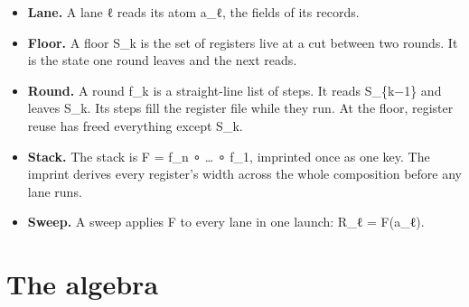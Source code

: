 \begin{itemize}
\item \textbf{Lane.} A lane ℓ reads its atom a\_\allowbreak{}ℓ, the fields of its records.
\item \textbf{Floor.} A floor S\_\allowbreak{}k is the set of registers live at a cut between two rounds. It is the state one round leaves and the next reads.
\item \textbf{Round.} A round f\_\allowbreak{}k is a straight-line list of steps. It reads S\_\allowbreak{}\{k−1\} and leaves S\_\allowbreak{}k. Its steps fill the register file while they run. At the floor, register reuse has freed everything except S\_\allowbreak{}k.
\item \textbf{Stack.} The stack is F = f\_\allowbreak{}n ∘ … ∘ f\_\allowbreak{}1, imprinted once as one key. The imprint derives every register's width across the whole composition before any lane runs.
\item \textbf{Sweep.} A sweep applies F to every lane in one launch: R\_\allowbreak{}ℓ = F(a\_\allowbreak{}ℓ).
\end{itemize}

\section{\texorpdfstring{The algebra}{The algebra}}

